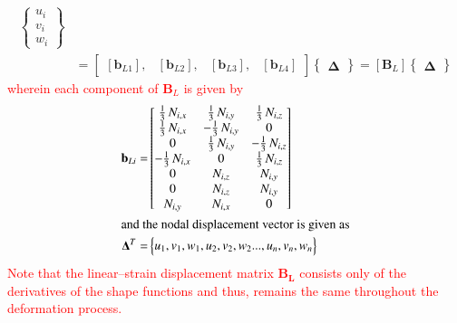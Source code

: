 \begin{equation}
\begin{aligned}
\begin{Bmatrix}
u_{i} \\
v_{i} \\
w_{i} \end{Bmatrix} \\
& = \begin{bmatrix}
[\mathbf{b}_{L1}], & [\mathbf{b}_{L2}], & [\mathbf{b}_{L3}], & [\mathbf{b}_{L4}]
\end{bmatrix}  \begin{Bmatrix} \boldsymbol{\Delta} \end{Bmatrix}  
= [\mathbf{B}_L] \begin{Bmatrix} \boldsymbol{\Delta} \end{Bmatrix} 
\end{aligned}
\end{equation}
\textcolor{red}{wherein each component of $\mathbf{B}_L$ is given by} 
\begin{subequations}
    \begin{align}
    \mathbf{b}_{Li} = & \begin{bmatrix}
    \tfrac{1}{3} \,  N_{i,x}  & \tfrac{1}{3} \,  N_{i,y} & \tfrac{1}{3} \,  N_{i,z} \\
    \tfrac{1}{3} \,  N_{i,x}  & -\tfrac{1}{3} \,  N_{i,y} & 0 \\ 0 & \tfrac{1}{3} \, N_{i,y}  & - \tfrac{1}{3} \,  N_{i,z} \\ - \tfrac{1}{3} \,  N_{i,x}  & 0 & \tfrac{1}{3} \,  N_{i,z} \\ 0 &  N_{i,z}  &  N_{i,y} \\ 0 & N_{i,z}  &   N_{i,y} \\  N_{i,y}  &   N_{i,x} & 0 \end{bmatrix}  \\
    \intertext{and the nodal displacement vector is given as}
    \mathbf{\Delta}^T  = &
    \begin{Bmatrix}
    u_1, v_1, w_1, u_2, v_2, w_2 ...,u_n, v_n, w_n
    \end{Bmatrix}
    \end{align}
\end{subequations}
\textcolor{red}{Note that the linear--strain displacement matrix $\mathbf{B_L}$ consists only of the derivatives of the shape functions and thus, remains the same throughout the deformation process.}

